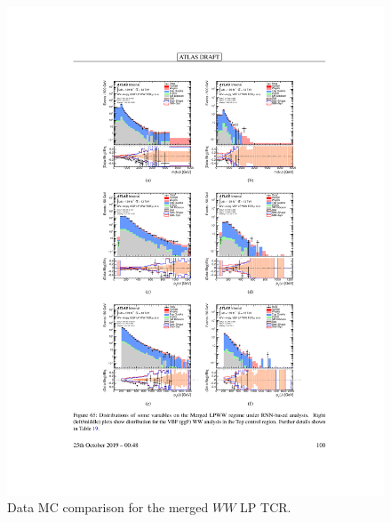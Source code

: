 \begin{figure}[h!]
  \centering
  \includegraphics[width=\hsize]{figures/Analysis/datamc/merged_lp_ww_tcr.pdf}
      \caption{Data MC comparison for the merged $WW$ LP TCR.} 
  \label{fig:merged_lp_ww_TCR_datamc}
\end{figure} 
\FloatBarrier


